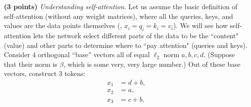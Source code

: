 \noindent {} 
\textbf{(3 points)} \textit{Understanding self-attention}. Let us assume the basic definition of self-attention (without any weight matrices), where all the queries, keys, and values are the data points themselves (\ie, $x_i = q_i = k_i = v_i$). We will see how self-attention lets the network select different parts of the data to be the ``content" (value) and other parts to determine where to ``pay attention" (queries and keys).
Consider 4 orthogonal ``base” vectors all of equal $\ell_2$ norm $a, b, c, d$. (Suppose that their norm is $\beta$, which is some very, very large number.) Out of these base vectors, construct 3 tokens:
\begin{align*}
    x_1 &= d + b, \\
    x_2 &= a, \\
    x_3 &= c + b.
\end{align*}
